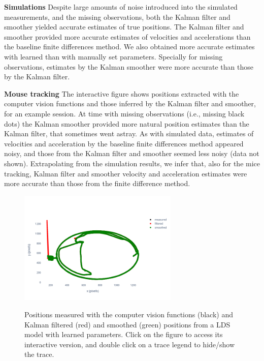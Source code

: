 
\noindent\textbf{Simulations}
%
Despite large amounts of noise introduced into the simulated measurements, and
the missing observations, both the Kalman filter and smoother yielded accurate
estimates of true positions.
%
The Kalman filter and smoother provided more accurate estimates of velocities
and accelerations than the baseline finite differences method.
%
We also obtained more accurate estimates with learned than with manually set
parameters.
%
Specially for missing observations, estimates by the Kalman smoother were more
accurate than those by the Kalman filter.

\noindent\textbf{Mouse tracking}
%
The interactive figure shows positions extracted with the computer vision
functions and those inferred by the Kalman filter and smoother, for an example
session. At time with missing observations (i.e., missing black dots) the
Kalman smoother provided more natural position estimates than the Kalman
filter, that sometimes went astray.
% 
As with simulated data, estimates of velocities and acceleration by the
baseline finite differences method appeared noisy, and those from the Kalman
filter and smoother seemed less noisy (data not shown). Extrapolating from the
simulation results, we infer that, also for the mice tracking, Kalman filter
and smoother velocity and acceleration estimates were more accurate than those
from the finite difference method.

\begin{figure}
    \begin{center}

        \href{http://www.gatsby.ucl.ac.uk/~rapela/fwg/reports/learning/figures/positions_smoothed_session003_start0.00_end15548.27_startPosition0_numPosition10000_pos_learnedParams.html}{\includegraphics[width=3in]{figures/positions_smoothed_session003_start0.00_end15548.27_startPosition0_numPosition10000_pos_learnedParams.png}}

        \caption{Positions measured with the computer vision functions (black)
        and Kalman filtered (red) and smoothed (green) positions from a LDS
        model with learned parameters. Click on the figure to access its
        interactive version, and double click on a trace legend to hide/show
        the trace.}

    \end{center}
\end{figure}

